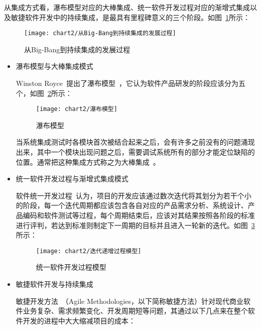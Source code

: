   从集成方式看，瀑布模型对应的大棒集成、统一软件开发过程对应的渐增式集成以及敏捷软件开发中的持续集成，是最具有里程碑意义的三个阶段。如图~\ref{fig:从Big-Bang到持续集成的发展过程}所示：

  	\begin{figure}[H] %
		\centering
		\texttt{[image: chart2/从Big-Bang到持续集成的发展过程]}
		\caption{从Big-Bang到持续集成的发展过程}
		\label{fig:从Big-Bang到持续集成的发展过程}
	\end{figure}
  
  \begin{itemize}
	\item 瀑布模型与大棒集成模式
	
	Winston Royce~\cite{34}提出了瀑布模型~\cite{35}，它认为软件产品研发的阶段应该分为五个，如图~\ref{fig:瀑布模型}所示：
	
	\begin{figure}[H] %
		\centering
		\texttt{[image: chart2/瀑布模型]}
		\caption{瀑布模型}
		\label{fig:瀑布模型}
	\end{figure}
	
	当系统集成测试时各模块首次被结合起来之后，会有许多之前没有的问题涌现出来，其中一个模块出现问题之后，需要调试系统所有的部分才能定位缺陷的位置。通常把这种集成方式称之为大棒集成~\cite{36}。
	
	\item 统一软件开发过程与渐增式集成模式
			
	软件统一开发过程~\cite{37}认为，项目的开发应该通过数次迭代将其划分为若干个小的阶段，每一个迭代周期都应该包含各自对应的产品需求分析、系统设计、产品编码和软件测试等过程，每个周期结束后，应该对其结果按照各阶段的标准进行评判，若达到标准则制定下一周期的目标并且进入一轮新的迭代。如图~\ref{fig:迭代递增过程模型}所示：

	\begin{figure}[H] %
		\centering
		\texttt{[image: chart2/迭代递增过程模型]}
		\caption{统一软件开发过程模型}
		\label{fig:迭代递增过程模型}
	\end{figure}
	
	\item 敏捷软件开发与持续集成
	
	敏捷开发方法~\cite{41}（Agile Methodologies，以下简称敏捷方法）针对现代商业软件业务复杂、需求频繁变化、开发周期短等问题，其通过以下几点来在整个软件开发的进程中大大缩减项目的成本：


\end{itemize}
